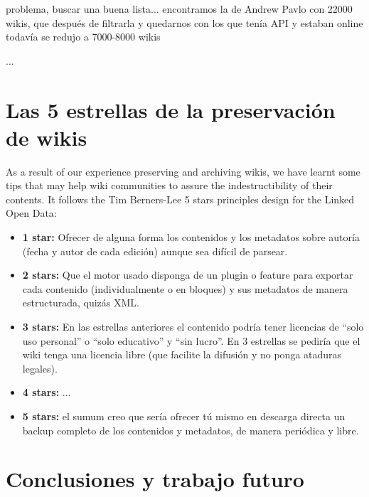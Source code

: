 \documentclass[11pt,twocolumn]{article}
\begin{document}
problema, buscar una buena lista... encontramos la de Andrew Pavlo con 22000 wikis, que después de filtrarla y quedarnos con los que tenía API y estaban online todavía se redujo a 7000-8000 wikis

...

\section{Las 5 estrellas de la preservación de wikis}

As a result of our experience preserving and archiving wikis, we have learnt some tips that may help wiki communities to assure the indestructibility of their contents. It follows the Tim Berners-Lee 5 stars principles design for the Linked Open Data:

\begin{itemize}
\item \textbf{1 star:} Ofrecer de alguna forma los contenidos y los metadatos sobre autoría (fecha y autor de cada edición) aunque sea difícil de parsear.
\item \textbf{2 stars:} Que el motor usado disponga de un plugin o feature para exportar cada contenido (individualmente o en bloques) y sus metadatos de manera estructurada, quizás XML.
\item \textbf{3 stars:} En las estrellas anteriores el contenido podría tener licencias de “solo uso personal” o “solo educativo” y “sin lucro”. En 3 estrellas se pediría que el wiki tenga una licencia libre (que facilite la difusión y no ponga ataduras legales).
\item \textbf{4 stars:} ...
\item \textbf{5 stars:} el sumum creo que sería ofrecer tú mismo en descarga directa un backup completo de los contenidos y metadatos, de manera periódica y libre.
\end{itemize}

\section{Conclusiones y trabajo futuro}

\end{document}
